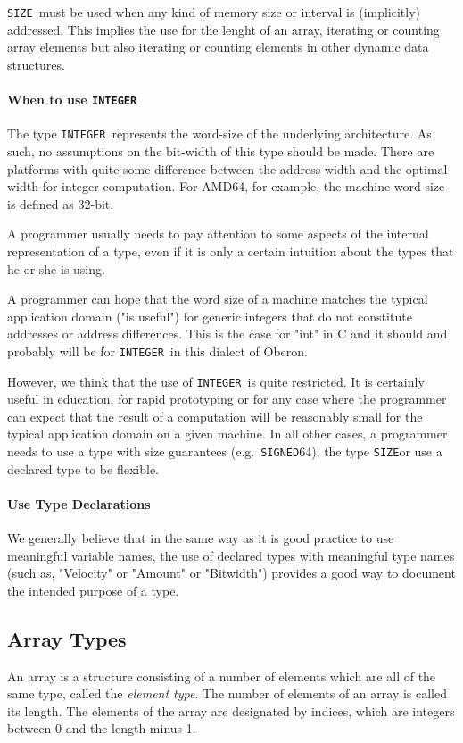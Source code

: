 \documentclass[a4wide,11pt]{article}
\newcommand{\INTEGER}{\lstinline"INTEGER"}
\newcommand{\SIGNED}{\lstinline"SIGNED"}
\newcommand{\SIZE}{\lstinline"SIZE"}
\begin{document}
\begin{annotation}
\SIZE\ must be used when any kind of memory size or interval is (implicitly) addressed.
This implies the use for the lenght of an array, iterating or counting array elements but also iterating or counting elements in other dynamic data structures.

\paragraph{When to use \INTEGER} The type \INTEGER\ represents the word-size of the underlying architecture.
As such, no assumptions on the bit-width of this type should be made.
There are platforms with quite some difference between the address width and the optimal width for integer computation.
For AMD64, for example, the machine word size is defined as 32-bit.

A programmer usually needs to pay attention to some aspects of the internal representation of a type, even if it is only a certain intuition about the types that he or she is using.

A programmer can hope that the word size of a machine matches the typical application domain ("is useful") for generic integers that do not constitute addresses or address differences.
This is the case for "int" in C and it should and probably will be for \INTEGER\ in this dialect of Oberon.

However, we think that the use of \INTEGER\ is quite restricted.
It is certainly useful in education, for rapid prototyping or for any case where the programmer can expect that the result of a computation will be reasonably small for the typical application domain on a given machine.
In all other cases, a programmer needs to use a type with size guarantees (e.g.\ \SIGNED64), the type \SIZE or use a declared type to be flexible.

\paragraph{Use Type Declarations} We generally believe that in the same way as it is good practice to use meaningful variable names, the use of declared types with meaningful type names (such as, "Velocity" or "Amount" or "Bitwidth") provides a good way to document the intended purpose of a type.

\end{annotation}

\subsection{Array Types}
An array is a structure consisting of a number of elements which are all of the same type, called the \emph{element type}.
The number of elements of an array is called its length.
The elements of the array are designated by indices, which are integers between 0 and the length minus 1.
\end{document}
